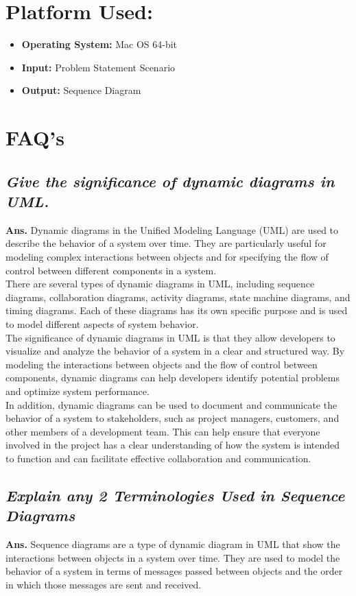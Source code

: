 \documentclass{article}
\begin{document}
\section{\textbf{Platform Used:}}
\begin{itemize}
	\item \textbf{Operating System:} Mac OS 64-bit
	\item \textbf{Input:} Problem Statement Scenario
	\item \textbf{Output:} Sequence Diagram
\end{itemize}
\section{\textbf{FAQ's}}
\subsection{\textit{Give the significance of dynamic diagrams in UML.}}
\textbf{Ans.} Dynamic diagrams in the Unified Modeling Language (UML) are used to describe the behavior of a system over time. They are particularly useful for modeling complex interactions between objects and for specifying the flow of control between different components in a system.\\

There are several types of dynamic diagrams in UML, including sequence diagrams, collaboration diagrams, activity diagrams, state machine diagrams, and timing diagrams. Each of these diagrams has its own specific purpose and is used to model different aspects of system behavior.\\

The significance of dynamic diagrams in UML is that they allow developers to visualize and analyze the behavior of a system in a clear and structured way. By modeling the interactions between objects and the flow of control between components, dynamic diagrams can help developers identify potential problems and optimize system performance.\\

In addition, dynamic diagrams can be used to document and communicate the behavior of a system to stakeholders, such as project managers, customers, and other members of a development team. This can help ensure that everyone involved in the project has a clear understanding of how the system is intended to function and can facilitate effective collaboration and communication.

\subsection{\textit{Explain any 2 Terminologies Used in Sequence Diagrams}}
\textbf{Ans.} Sequence diagrams are a type of dynamic diagram in UML that show the interactions between objects in a system over time. They are used to model the behavior of a system in terms of messages passed between objects and the order in which those messages are sent and received.\\
\end{document}
